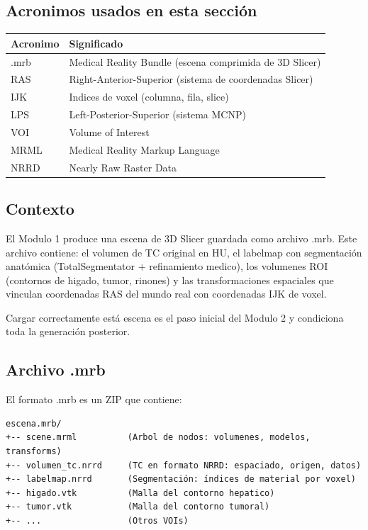 \documentclass[12pt,a4paper]{article}
\begin{document}
\subsection*{Acronimos usados en esta sección}
\begin{tabular}{ll}
\toprule
\textbf{Acronimo} & \textbf{Significado} \\
\midrule
.mrb & Medical Reality Bundle (escena comprimida de 3D Slicer) \\
RAS & Right-Anterior-Superior (sistema de coordenadas Slicer) \\
IJK & Indices de voxel (columna, fila, slice) \\
LPS & Left-Posterior-Superior (sistema MCNP) \\
VOI & Volume of Interest \\
MRML & Medical Reality Markup Language \\
NRRD & Nearly Raw Raster Data \\
\bottomrule
\end{tabular}

\subsection{Contexto}

El Modulo 1 produce una escena de 3D Slicer guardada como archivo .mrb. Este archivo contiene: el volumen de TC original en HU, el labelmap con segmentación anatómica (TotalSegmentator + refinamiento medico), los volumenes ROI (contornos de higado, tumor, rinones) y las transformaciones espaciales que vinculan coordenadas RAS del mundo real con coordenadas IJK de voxel.

Cargar correctamente está escena es el paso inicial del Modulo 2 y condiciona toda la generación posterior.

\subsection{Archivo .mrb}

El formato .mrb es un ZIP que contiene:

\begin{lstlisting}
escena.mrb/
+-- scene.mrml          (Arbol de nodos: volumenes, modelos, transforms)
+-- volumen_tc.nrrd     (TC en formato NRRD: espaciado, origen, datos)
+-- labelmap.nrrd       (Segmentación: índices de material por voxel)
+-- higado.vtk          (Malla del contorno hepatico)
+-- tumor.vtk           (Malla del contorno tumoral)
+-- ...                 (Otros VOIs)
\end{lstlisting}
\end{document}
